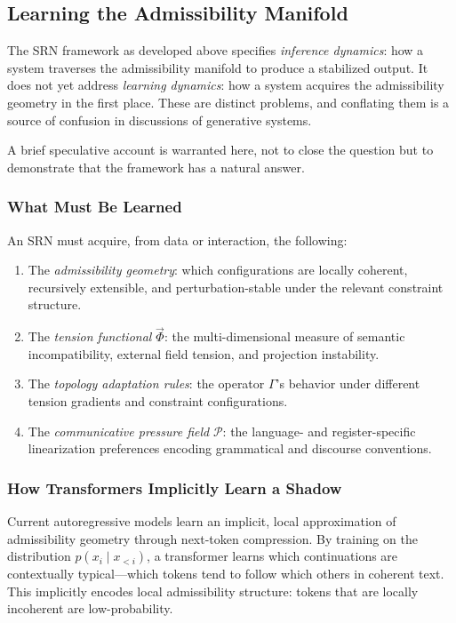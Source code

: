 \documentclass[11pt, a4paper]{article}
\theoremstyle{srn}
\theoremstyle{srnremark}
\newcommand{\Gop}{\Gamma}              %
\newcommand{\Phiten}{\varPhi}            %
\begin{document}
\subsection{Learning the Admissibility Manifold}

The SRN framework as developed above specifies \emph{inference
dynamics}: how a system traverses the admissibility manifold to
produce a stabilized output.
It does not yet address \emph{learning dynamics}: how a system
acquires the admissibility geometry in the first place.
These are distinct problems, and conflating them is a source of
confusion in discussions of generative systems.

A brief speculative account is warranted here, not to close the
question but to demonstrate that the framework has a natural answer.

\subsubsection*{What Must Be Learned}

An SRN must acquire, from data or interaction, the following:

\begin{enumerate}
  \item The \emph{admissibility geometry}: which configurations are
    locally coherent, recursively extensible, and perturbation-stable
    under the relevant constraint structure.
  \item The \emph{tension functional} $\vec{\Phiten}$: the
    multi-dimensional measure of semantic incompatibility, external
    field tension, and projection instability.
  \item The \emph{topology adaptation rules}: the operator $\Gop$'s
    behavior under different tension gradients and constraint
    configurations.
  \item The \emph{communicative pressure field} $\mathcal{P}$:
    the language- and register-specific linearization preferences
    encoding grammatical and discourse conventions.
\end{enumerate}

\subsubsection*{How Transformers Implicitly Learn a Shadow}

Current autoregressive models learn an implicit, local approximation
of admissibility geometry through next-token compression.
By training on the distribution $p(x_i \mid x_{<i})$, a transformer
learns which continuations are contextually typical---which tokens
tend to follow which others in coherent text.
This implicitly encodes local admissibility structure: tokens that are
locally incoherent are low-probability.
\end{document}
